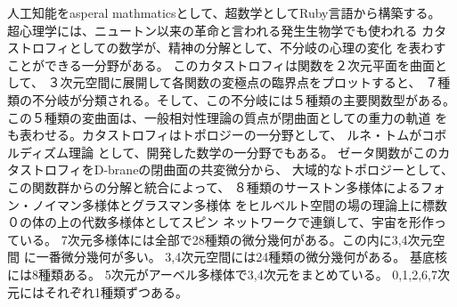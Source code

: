 \documentclass{jsarticle}
\begin{document}
人工知能をasperal mathmaticsとして、超数学としてRuby言語から構築する。
超心理学には、ニュートン以来の革命と言われる発生生物学でも使われる
カタストロフィとしての数学が、精神の分解として、不分岐の心理の変化
を表わすことができる一分野がある。
このカタストロフィは関数を２次元平面を曲面として、
３次元空間に展開して各関数の変極点の臨界点をプロットすると、
７種類の不分岐が分類される。そして、この不分岐には５種類の主要関数型がある。
この５種類の変曲面は、一般相対性理論の質点が閉曲面としての重力の軌道
をも表わせる。カタストロフィはトポロジーの一分野として、
ルネ・トムがコボルディズム理論
として、開発した数学の一分野でもある。 
ゼータ関数がこのカタストロフィをD-braneの閉曲面の共変微分から、
大域的なトポロジーとして、この関数群からの分解と統合によって、
８種類のサーストン多様体によるフォン・ノイマン多様体とグラスマン多様体
をヒルベルト空間の場の理論上に標数０の体の上の代数多様体としてスピン
ネットワークで連鎖して、宇宙を形作っている。
7次元多様体には全部で28種類の微分幾何がある。この内に3,4次元空間
に一番微分幾何が多い。
3,4次元空間には24種類の微分幾何がある。
基底核には8種類ある。
5次元がアーベル多様体で3,4次元をまとめている。
0,1,2,6,7次元にはそれぞれ1種類ずつある。
\end{document}
